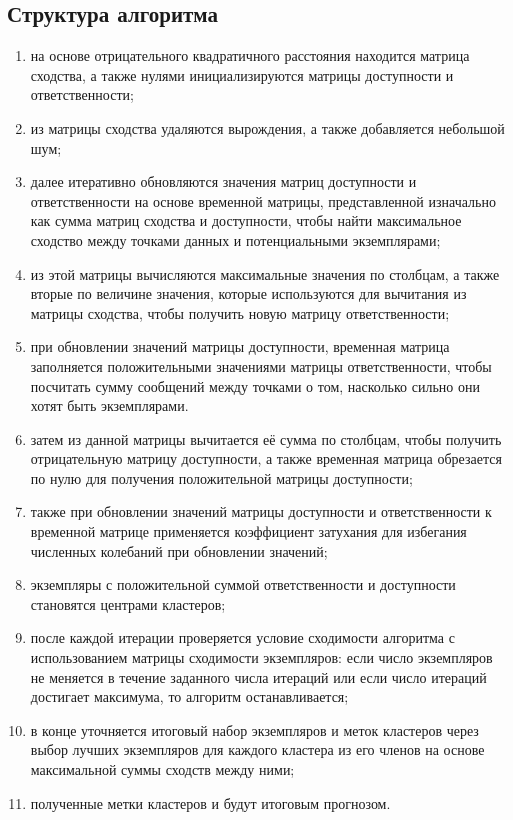 \subsection{Структура алгоритма}

\begin{enumerate}
    \item на основе отрицательного квадратичного расстояния находится матрица сходства, а также нулями инициализируются матрицы доступности и ответственности;
          
    \item из матрицы сходства удаляются вырождения, а также добавляется небольшой шум;
          
    \item далее итеративно обновляются значения матриц доступности и ответственности на основе временной матрицы, представленной изначально как сумма матриц сходства и доступности, чтобы найти максимальное сходство между точками данных и потенциальными экземплярами;
          
    \item из этой матрицы вычисляются максимальные значения по столбцам, а также вторые по величине значения, которые используются для вычитания из матрицы сходства, чтобы получить новую матрицу ответственности;
          
    \item при обновлении значений матрицы доступности, временная матрица заполняется положительными значениями матрицы ответственности, чтобы посчитать сумму сообщений между точками о том, насколько сильно они хотят быть экземплярами.
          
    \item затем из данной матрицы вычитается её сумма по столбцам, чтобы получить отрицательную матрицу доступности, а также временная матрица обрезается по нулю для получения положительной матрицы доступности;
          
    \item также при обновлении значений матрицы доступности и ответственности к временной матрице применяется коэффициент затухания для избегания численных колебаний при обновлении значений;
          
    \item экземпляры с положительной суммой ответственности и доступности становятся центрами кластеров;
          
    \item после каждой итерации проверяется условие сходимости алгоритма с использованием матрицы сходимости экземпляров: если число экземпляров не меняется в течение заданного числа итераций или если число итераций достигает максимума, то алгоритм останавливается;
          
    \item в конце уточняется итоговый набор экземпляров и меток кластеров через выбор лучших экземпляров для каждого кластера из его членов на основе максимальной суммы сходств между ними;
          
    \item полученные метки кластеров и будут итоговым прогнозом.
          
\end{enumerate}


